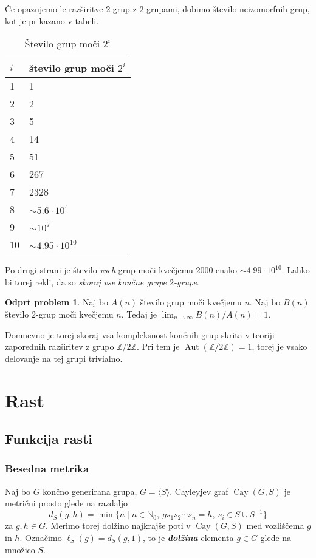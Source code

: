 \documentclass[11pt]{book}
\def\NN{\mathbb{N}}
\def\ZZ{\mathbb{Z}}
\DeclareMathOperator\Aut{Aut}
\DeclareMathOperator\Cay{Cay}
\def\definicija{\color{rdeca}\bf\em}
\theoremstyle{definition}
\theoremstyle{zgled}
\theoremstyle{odprtproblem}
\newtheorem*{odprtproblem}{Odprt problem}
\theoremstyle{domacanaloga}
\theoremstyle{izrek}
\begin{document}
Če opazujemo le razširitve $2$-grup z $2$-grupami, dobimo število neizomorfnih grup, kot je prikazano v tabeli.

\begin{table}[t]
    \centering
\begin{tabular}{ll}
    $i$ & število grup moči $2^i$ \\ \hline
    1 & 1 \\
    2 & 2 \\
    3 & 5 \\
    4 & 14 \\
    5 & 51 \\
    6 & 267 \\
    7 & 2328 \\
    8 & $\sim 5.6 \cdot 10^4$ \\
    9 & $\sim 10^7$ \\
    10 & $\sim 4.95 \cdot 10^{10}$
\end{tabular}
\caption{Število grup moči $2^i$}
\end{table}

Po drugi strani je število {\em vseh} grup moči kvečjemu $2000$ enako $\sim 4.99 \cdot 10^{10}$. Lahko bi torej rekli, da so {\em skoraj vse končne grupe $2$-grupe}.

\begin{odprtproblem}
Naj bo $A(n)$ število grup moči kvečjemu $n$. Naj bo $B(n)$ število $2$-grup moči kvečjemu $n$. Tedaj je $\lim_{n \to \infty} B(n)/A(n) = 1$.
\end{odprtproblem}

Domnevno je torej skoraj vsa kompleksnost končnih grup skrita v teoriji zaporednih razširitev z grupo $\ZZ/2\ZZ$. Pri tem je $\Aut(\ZZ/2\ZZ) = 1$, torej je vsako delovanje na tej grupi trivialno.

\chapter{Rast}

\section{Funkcija rasti}

\subsection{Besedna metrika}

Naj bo $G$ končno generirana grupa, $G = \langle S \rangle$. Cayleyjev graf $\Cay(G,S)$ je metrični prosto glede na razdaljo
\[
d_S(g,h) = \min \{ n \mid n \in \NN_0, \ g s_1 s_2 \cdots s_n = h, \ s_i \in S \cup S^{-1} \}
\]
za $g,h \in G$. Merimo torej dolžino najkrajše poti v $\Cay(G,S)$ med vozliščema $g$ in $h$. Označimo $\ell_S(g) = d_S(g,1)$, to je {\definicija dolžina} elementa $g \in G$ glede na množico $S$.
\end{document}
